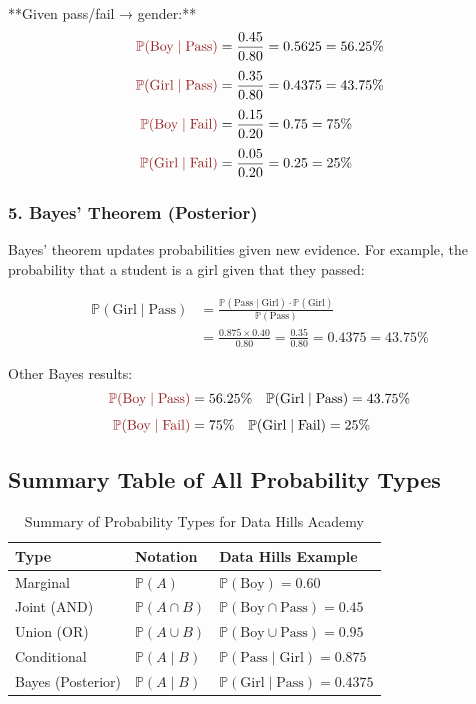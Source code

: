 \documentclass[12pt,a4paper,oneside]{report}
\theoremstyle{mytheorem}
\theoremstyle{mydefinition}
\theoremstyle{myremark}
\newcommand{\Prob}{\mathbb{P}}
\begin{document}
**Given pass/fail → gender:**
\[
\begin{aligned}
\color{myred} \Prob(\text{Boy} \mid \text{Pass})
&= \frac{0.45}{0.80} = 0.5625 = 56.25\% \\[4pt]
\color{myred} \Prob(\text{Girl} \mid \text{Pass})
&= \frac{0.35}{0.80} = 0.4375 = 43.75\% \\[4pt]
\color{myred} \Prob(\text{Boy} \mid \text{Fail})
&= \frac{0.15}{0.20} = 0.75 = 75\% \\[4pt]
\color{myred} \Prob(\text{Girl} \mid \text{Fail})
&= \frac{0.05}{0.20} = 0.25 = 25\%
\end{aligned}
\]

\subsubsection*{5. Bayes' Theorem (Posterior)}
Bayes' theorem updates probabilities given new evidence. For example, the probability that a student is a girl given that they passed:

\[
\begin{aligned}
\Prob(\text{Girl} \mid \text{Pass})
&= \frac{\Prob(\text{Pass} \mid \text{Girl}) \cdot \Prob(\text{Girl})}{\Prob(\text{Pass})} \\[6pt]
&= \frac{0.875 \times 0.40}{0.80} = \frac{0.35}{0.80} = 0.4375 = 43.75\%
\end{aligned}
\]

Other Bayes results:
\[
\begin{aligned}
\color{myred} \Prob(\text{Boy} \mid \text{Pass}) &= 56.25\% \quad
\Prob(\text{Girl} \mid \text{Pass}) = 43.75\% \\[4pt]
\color{myred} \Prob(\text{Boy} \mid \text{Fail}) &= 75\% \quad
\Prob(\text{Girl} \mid \text{Fail}) = 25\%
\end{aligned}
\]

\subsection*{Summary Table of All Probability Types}
\begin{table}[h]
\centering
\caption{Summary of Probability Types for Data Hills Academy}
\begin{tabular}{l|l|l}
\toprule
\textbf{Type} & \textbf{Notation} & \textbf{Data Hills Example} \\
\midrule
\color{myblue} Marginal & $\Prob(A)$ & $\Prob(\text{Boy}) = 0.60$ \\
\color{mygreen} Joint (AND) & $\Prob(A \cap B)$ & $\Prob(\text{Boy} \cap \text{Pass}) = 0.45$ \\
\color{mypurple} Union (OR) & $\Prob(A \cup B)$ & $\Prob(\text{Boy} \cup \text{Pass}) = 0.95$ \\
\color{myorange} Conditional & $\Prob(A \mid B)$ & $\Prob(\text{Pass} \mid \text{Girl}) = 0.875$ \\
\color{myred} Bayes (Posterior) & $\Prob(A \mid B)$ & $\Prob(\text{Girl} \mid \text{Pass}) = 0.4375$ \\
\bottomrule
\end{tabular}
\end{table}
\end{document}

